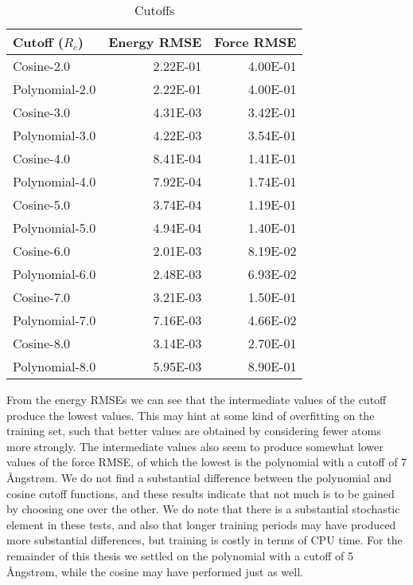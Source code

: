 \begin{table}[H]
\centering
\begin{tabular}{lrr}
\toprule
         Cutoff ($R_c$) &  Energy RMSE &  Force RMSE \\
\midrule
     Cosine-2.0 &     2.22E-01 &    4.00E-01 \\
 Polynomial-2.0 &     2.22E-01 &    4.00E-01 \\
     Cosine-3.0 &     4.31E-03 &    3.42E-01 \\
 Polynomial-3.0 &     4.22E-03 &    3.54E-01 \\
     Cosine-4.0 &     8.41E-04 &    1.41E-01 \\
 Polynomial-4.0 &     7.92E-04 &    1.74E-01 \\
     Cosine-5.0 &     3.74E-04 &    1.19E-01 \\
 Polynomial-5.0 &     4.94E-04 &    1.40E-01 \\
     Cosine-6.0 &     2.01E-03 &    8.19E-02 \\
 Polynomial-6.0 &     2.48E-03 &    6.93E-02 \\
     Cosine-7.0 &     3.21E-03 &    1.50E-01 \\
 Polynomial-7.0 &     7.16E-03 &    4.66E-02 \\
     Cosine-8.0 &     3.14E-03 &    2.70E-01 \\
 Polynomial-8.0 &     5.95E-03 &    8.90E-01 \\
\bottomrule
\end{tabular}
\caption{Cutoffs}
\label{table:cutoffs}
\end{table}

From the energy RMSEs we can see that the intermediate values of the
cutoff produce the lowest values. This may hint at some kind
of overfitting on the training set,
such that better values are obtained by considering fewer atoms more strongly.
The intermediate values also
seem to produce somewhat lower values of the force RMSE,
of which the lowest is the polynomial with a cutoff of 7 Ångstrøm.
We do not find a substantial difference between the polynomial
and cosine cutoff functions, and these results indicate that not
much is to be gained by choosing one over the other.
We do note that there is a substantial
stochastic element in these tests, and also that longer training
periods may have produced more substantial differences, but
training is costly in terms of CPU time.
For the remainder
of this thesis we settled on the polynomial with a cutoff of 5 Ångstrøm,
while the cosine may have performed just as well.

